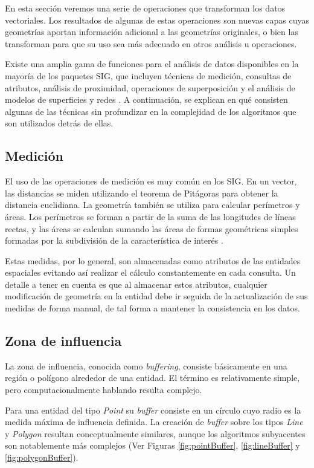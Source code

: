 En esta sección veremos una serie de operaciones que transforman los datos vectoriales. Los resultados de algunas de estas operaciones son nuevas capas cuyas geometrías aportan información adicional a las geometrías originales, o bien las transforman para que su uso sea más adecuado en otros análisis u operaciones.

Existe una amplia gama de funciones para el análisis de datos disponibles en la mayoría de los paquetes SIG, que incluyen técnicas de medición, consultas de atributos, análisis de proximidad, operaciones de superposición y el análisis de modelos de superficies y redes \citep{Heywood2006AnSystems}. A continuación, se explican en qué consisten algunas de las técnicas sin profundizar en la complejidad de los algoritmos que son utilizados detrás de ellas.

\subsection{Medición}

El uso de las operaciones de medición es muy común en los SIG. En un vector, las distancias se miden utilizando el teorema de Pitágoras para obtener la distancia euclidiana. La geometría también se utiliza para calcular perímetros y áreas. Los perímetros se forman a partir de la suma de las longitudes de líneas rectas, y las áreas se calculan sumando las áreas de formas geométricas simples formadas por la subdivisión de la característica de interés \citep{Heywood2006AnSystems}.

Estas medidas, por lo general, son almacenadas como atributos de las entidades espaciales evitando así realizar el cálculo constantemente en cada consulta. Un detalle a tener en cuenta es que al almacenar estos atributos, cualquier modificación de geometría en la entidad debe ir seguida de la actualización de sus medidas de forma manual, de tal forma a mantener la consistencia en los datos.

\subsection{Zona de influencia}

La zona de influencia, conocida como \textit{buffering}, consiste básicamente en una región o polígono alrededor de una entidad. El término es relativamente simple, pero computacionalmente hablando resulta complejo. 

Para una entidad del tipo \textit{Point} su \textit{buffer} consiste en un círculo cuyo radio es la medida máxima de influencia definida. La creación de \textit{buffer} sobre los tipos \textit{Line} y \textit{Polygon} resultan conceptualmente similares, aunque los algoritmos subyacentes son notablemente más complejos (Ver Figuras \ref{fig:pointBuffer}, \ref{fig:lineBuffer} y \ref{fig:polygonBuffer}).


